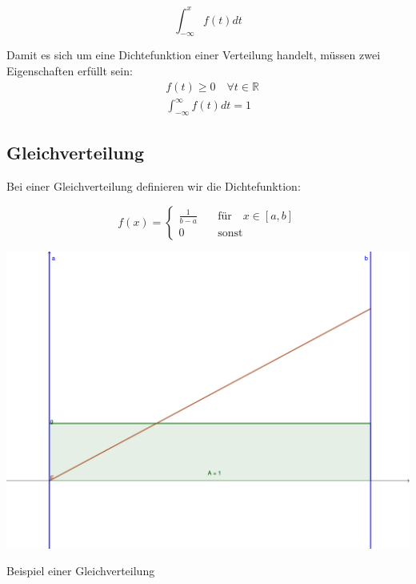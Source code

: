 \documentclass{tufte-handout}
\theoremstyle{own}
\begin{document}
\begin{equation}
	\int_{-\infty}^x f(t) dt 
\end{equation}

Damit es sich um eine Dichtefunktion einer Verteilung handelt, müssen zwei Eigenschaften erfüllt sein:
\begin{align}
&f(t) \geq 0 \hspace{1em} \forall t \in \mathbb{R} \label{dichteeig:1}\\
&\int_{-\infty}^{\infty} f(t) dt =1 \label{dichteeig:2}
\end{align}

\subsection{Gleichverteilung}

Bei einer Gleichverteilung definieren wir die Dichtefunktion:

\begin{equation}
f(x) = \begin{cases}
\frac{1}{b-a} \hspace{1em} &\text{für} \hspace{1em} x \in [a,b] \\
0 \hspace{1em} &\text{sonst}
\end{cases}
\end{equation}

\begin{marginfigure}
	\includegraphics{gleichverteilung}
	\caption{Beispiel einer Gleichverteilung}
\end{marginfigure}
\end{document}
